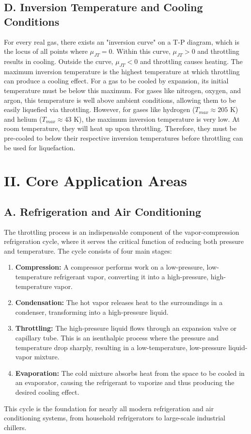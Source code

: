 \documentclass[aps,prl,reprint,groupedaddress]{revtex4-2}
\begin{document}
\subsection{D. Inversion Temperature and Cooling Conditions}
For every real gas, there exists an "inversion curve" on a T-P diagram, which is the locus of all points where $\mu_{JT}=0$. Within this curve, $\mu_{JT}>0$ and throttling results in cooling. Outside the curve, $\mu_{JT}<0$ and throttling causes heating.
The maximum inversion temperature is the highest temperature at which throttling can produce a cooling effect. For a gas to be cooled by expansion, its initial temperature must be below this maximum. For gases like nitrogen, oxygen, and argon, this temperature is well above ambient conditions, allowing them to be easily liquefied via throttling. However, for gases like hydrogen ($T_{max} \approx 205$ K) and helium ($T_{max} \approx 43$ K), the maximum inversion temperature is very low. At room temperature, they will heat up upon throttling. Therefore, they must be pre-cooled to below their respective inversion temperatures before throttling can be used for liquefaction.

\section{II. Core Application Areas}

\subsection{A. Refrigeration and Air Conditioning}
The throttling process is an indispensable component of the vapor-compression refrigeration cycle, where it serves the critical function of reducing both pressure and temperature. The cycle consists of four main stages:
\begin{enumerate}
    \item \textbf{Compression:} A compressor performs work on a low-pressure, low-temperature refrigerant vapor, converting it into a high-pressure, high-temperature vapor.
    \item \textbf{Condensation:} The hot vapor releases heat to the surroundings in a condenser, transforming into a high-pressure liquid.
    \item \textbf{Throttling:} The high-pressure liquid flows through an expansion valve or capillary tube. This is an isenthalpic process where the pressure and temperature drop sharply, resulting in a low-temperature, low-pressure liquid-vapor mixture.
    \item \textbf{Evaporation:} The cold mixture absorbs heat from the space to be cooled in an evaporator, causing the refrigerant to vaporize and thus producing the desired cooling effect.
\end{enumerate}
This cycle is the foundation for nearly all modern refrigeration and air conditioning systems, from household refrigerators to large-scale industrial chillers.
\end{document}
